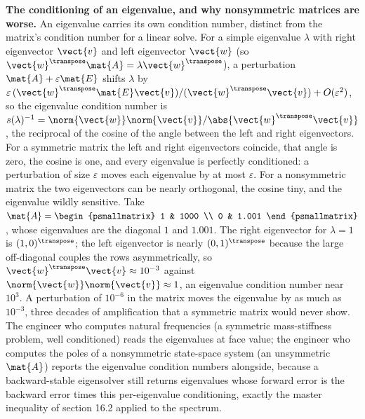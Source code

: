 \begin{example}
\textbf{The conditioning of an eigenvalue, and why nonsymmetric matrices are
worse.} An eigenvalue carries its own condition number, distinct from the
matrix's condition number for a linear solve. For a simple eigenvalue
$\lambda$ with right eigenvector $\vect{v}$ and left eigenvector $\vect{w}$
(so $\vect{w}^{\transpose}\mat{A} = \lambda \vect{w}^{\transpose}$), a
perturbation $\mat{A} + \varepsilon\mat{E}$ shifts $\lambda$ by
$\varepsilon\, (\vect{w}^{\transpose}\mat{E}\vect{v})/(\vect{w}^{\transpose}
\vect{v}) + O(\varepsilon^{2})$, so the eigenvalue condition number is
$s(\lambda)^{-1} = \norm{\vect{w}}\norm{\vect{v}}/\abs{\vect{w}^{\transpose}
\vect{v}}$, the reciprocal of the cosine of the angle between the left and
right eigenvectors. For a symmetric matrix the left and right eigenvectors
coincide, that angle is zero, the cosine is one, and every eigenvalue is
perfectly conditioned: a perturbation of size $\varepsilon$ moves each
eigenvalue by at most $\varepsilon$. For a nonsymmetric matrix the two
eigenvectors can be nearly orthogonal, the cosine tiny, and the eigenvalue
wildly sensitive. Take $\mat{A} = \begin{psmallmatrix} 1 & 1000 \\ 0 & 1.001
\end{psmallmatrix}$, whose eigenvalues are the diagonal $1$ and $1.001$. The
right eigenvector for $\lambda = 1$ is $(1, 0)^{\transpose}$; the left
eigenvector is nearly $(0, 1)^{\transpose}$ because the large off-diagonal
couples the rows asymmetrically, so $\vect{w}^{\transpose}\vect{v} \approx
10^{-3}$ against $\norm{\vect{w}}\norm{\vect{v}} \approx 1$, an eigenvalue
condition number near $10^{3}$. A perturbation of $10^{-6}$ in the matrix
moves the eigenvalue by as much as $10^{-3}$, three decades of amplification
that a symmetric matrix would never show. The engineer who computes natural
frequencies (a symmetric mass-stiffness problem, well conditioned) reads the
eigenvalues at face value; the engineer who computes the poles of a
nonsymmetric state-space system (an unsymmetric $\mat{A}$) reports the
eigenvalue condition numbers alongside, because a backward-stable eigensolver
still returns eigenvalues whose forward error is the backward error times this
per-eigenvalue conditioning, exactly the master inequality of section 16.2
applied to the spectrum.
\end{example}

